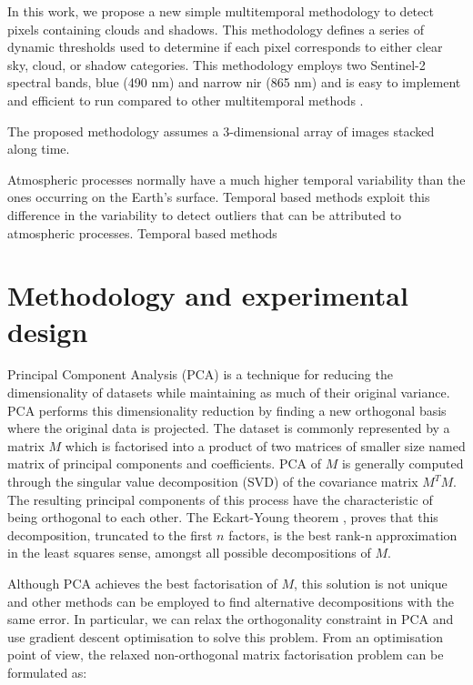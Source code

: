 \documentclass[essd, manuscript]{copernicus}
\begin{document}
In this work, we propose a new simple multitemporal methodology to detect pixels containing clouds and shadows. This methodology defines a series of dynamic thresholds used to determine if each pixel corresponds to either clear sky, cloud, or shadow categories. This methodology employs two Sentinel-2 spectral bands, blue (490 nm) and narrow nir (865 nm) and is easy to implement and efficient to run compared to other multitemporal methods \citep{frantz2015enhancing,zhu2018automatic}.

The proposed methodology assumes a 3-dimensional array of images stacked along time. 

Atmospheric processes normally have a much higher temporal variability than the ones occurring on the Earth's surface. Temporal based methods exploit this difference in the variability to detect outliers that can be attributed to atmospheric processes. Temporal based methods  


\section{Methodology and experimental design}

Principal Component Analysis (PCA) is a technique for reducing the dimensionality of datasets while maintaining as much of their original variance. PCA performs this dimensionality reduction by finding a new orthogonal basis where the original data is projected. The dataset is commonly represented by a matrix $M$ which is factorised into a product of two matrices of smaller size named matrix of principal components and coefficients. PCA of $M$ is generally computed through the singular value decomposition (SVD) of the covariance matrix $M^TM$. The resulting principal components of this process have the characteristic of being orthogonal to each other. The Eckart-Young theorem \citep{eckart1936approximation}, proves that this decomposition, truncated to the first $n$ factors, is the best rank-n approximation in the least squares sense, amongst all possible decompositions of $M$. 

Although PCA achieves the best factorisation of $M$, this solution is not unique and other methods can be employed to find alternative decompositions with the same error. In particular, we can relax the orthogonality constraint in PCA and use gradient descent optimisation to solve this problem. From an optimisation point of view, the relaxed non-orthogonal matrix factorisation problem can be formulated as:
\end{document}
